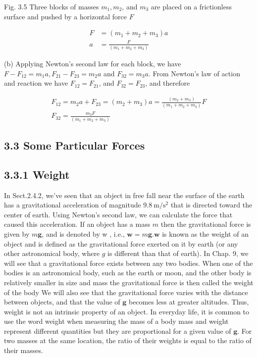 \documentclass[10pt]{article}
\begin{document}
Fig. 3.5 Three blocks of masses $m_{1}, m_{2}$, and $m_{3}$ are placed on a frictionless surface and pushed by a horizontal force $F$

$$
\begin{aligned}
F & =\left(m_{1}+m_{2}+m_{3}\right) a \\
a & =\frac{F}{\left(m_{1}+m_{2}+m_{3}\right)}
\end{aligned}
$$

(b) Applying Newton's second law for each block, we have $F-F_{12}=m_{1} a, F_{21}-F_{23}=m_{2} a$ and $F_{32}=m_{3} a$. From Newton's law of action and reaction we have $F_{12}=F_{21}$, and $F_{32}=F_{23}$, and therefore

$$
\begin{gathered}
F_{12}=m_{2} a+F_{23}=\left(m_{2}+m_{3}\right) a=\frac{\left(m_{2}+m_{3}\right)}{\left(m_{1}+m_{2}+m_{3}\right)} F \\
F_{32}=\frac{m_{3} F}{\left(m_{1}+m_{2}+m_{3}\right)}
\end{gathered}
$$

\subsection*{3.3 Some Particular Forces}
\subsection*{3.3.1 Weight}
In Sect.2.4.2, we've seen that an object in free fall near the surface of the earth has a gravitational acceleration of magnitude $9.8 \mathrm{~m} / \mathrm{s}^{2}$ that is directed toward the center of earth. Using Newton's second law, we can calculate the force that caused this acceleration. If an object has a mass $m$ then the gravitational force is given by $m \mathbf{g}$, and is denoted by w , i.e., $\mathbf{w}=m \mathbf{g} . \mathbf{w}$ is known as the weight of an object and is defined as the gravitational force exerted on it by earth (or any other astronomical body, where $g$ is different than that of earth). In Chap. 9, we will see that a gravitational force exists between any two bodies. When one of the bodies is an astronomical body, such as the earth or moon, and the other body is relatively smaller in size and mass the gravitational force is then called the weight of the body We will also see that the gravitational force varies with the distance between objects, and that the value of $\mathbf{g}$ becomes less at greater altitudes. Thus, weight is not an intrinsic property of an object. In everyday life, it is common to use the word weight when measuring the mass of a body mass and weight represent different quantities but they are proportional for a given value of $\mathbf{g}$. For two masses at the same location, the ratio of their weights is equal to the ratio of their masses.
\end{document}

